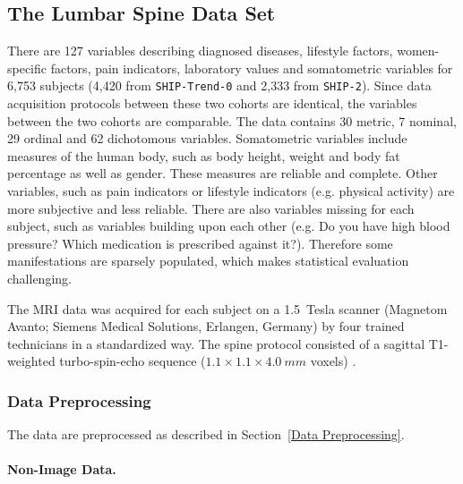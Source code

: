 \documentclass[journal]{style/vgtc} 			          %
\begin{document}
\subsection{The Lumbar Spine Data Set}
%
There are 127 variables describing diagnosed diseases, lifestyle factors, women-specific factors, pain indicators, laboratory values and somatometric variables for 6,753 subjects (4,420 from \texttt{SHIP-Trend-0} and 2,333 from \texttt{SHIP-2}).
%
Since data acquisition protocols between these two cohorts are identical, the variables between the two cohorts are comparable.
%
The data contains 30 metric, 7 nominal, 29 ordinal and 62 dichotomous variables.
%
Somatometric variables include measures of the human body, such as body height, weight and body fat percentage as well as gender.
%
These measures are reliable and complete.
%
Other variables, such as pain indicators or lifestyle indicators (e.g. physical activity) are more subjective and less reliable.
%
There are also variables missing for each subject, such as variables building upon each other (e.g. Do you have high blood pressure? Which medication is prescribed against it?).
%
Therefore some manifestations are sparsely populated, which makes statistical evaluation challenging.
%
%

The MRI data was acquired for each subject on a 1.5~Tesla scanner (Magnetom Avanto; Siemens Medical Solutions, Erlangen, Germany) by four trained technicians in a standardized way.
%
The spine protocol consisted of a sagittal T1-weighted turbo-spin-echo sequence ($1.1\times1.1\times4.0~mm$ voxels) \cite{Hegenscheid2013}. %

\subsubsection{Data Preprocessing} \label{application:Data Preprocessing}
The data are preprocessed as described in Section~\ref{Data Preprocessing}.
%
\paragraph{Non-Image Data.} 
\end{document}
